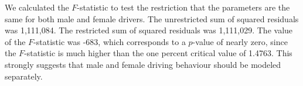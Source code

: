 



We calculated the $F$-statistic to test the restriction 
that the parameters are the same for both male and female drivers. 
The unrestricted sum of squared residuals was 1,111,084. 
The restricted sum of squared residuals was 1,111,029. 
The value of the $F$-statistic was -683, 
which corresponds to a $p$-value of nearly zero, since the $F$-statistic is much higher than 
 the one percent critical value of 1.4763. 
This strongly suggests that male and female driving behaviour should be modeled separately. 
